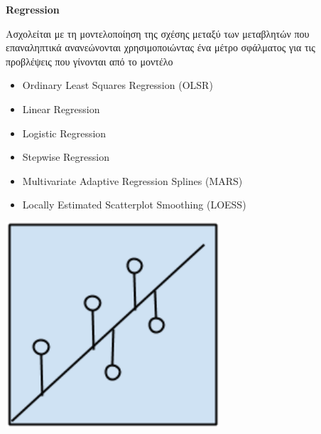 \begin{minipage}{0.5\textwidth}

  \textbf{\large Regression}

  Aσχολείται με τη μοντελοποίηση της σχέσης μεταξύ των μεταβλητών που επαναληπτικά ανανεώνονται
  χρησιμοποιώντας ένα μέτρο σφάλματος για τις προβλέψεις που γίνονται από το μοντέλο
  \begin{itemize}
    \setlength\itemsep{0em}
    \item{Ordinary Least Squares Regression (OLSR)}
    \item{Linear Regression}
    \item{Logistic Regression}
    \item{Stepwise Regression}
    \item{Multivariate Adaptive Regression Splines (MARS)}
    \item{Locally Estimated Scatterplot Smoothing (LOESS)}
  \end{itemize}
\end{minipage}
\begin{minipage}{0.5\textwidth}
  \begin{center}
    \includegraphics[width=0.6\textwidth]{./images/chapter3/regression_algorithms.png}
  \end{center}
\end{minipage}

